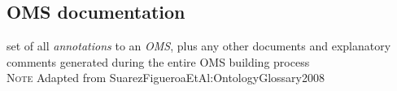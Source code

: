 \documentclass[10pt,%
\ifpretendfinal
final%
\else
draft%
\fi,
]{scrreprt}
\makeatletter
\newcommand*\CommentAuthor{}
\renewcommand*\CommentAuthor{#1}}
\newcommand*\CommentDate{}
\renewcommand*\CommentDate{#1}}
\newcommand*\CommentId{}
\renewcommand*\CommentId{#1}}
\newcommand*\CommentType{}
\renewcommand*\CommentType{#1}}
\newcommand*{\SetCommentColorByType}[1]{%
\edef\localType{{#1}}%
\expandafter\ifstrequal\localType{q-aut}{\colorlet{CommentColor}{red}}{%
\expandafter\ifstrequal\localType{q-all}{\colorlet{CommentColor}{orange}}{%
\expandafter\ifstrequal\localType{todo}{\colorlet{CommentColor}{orange}}{%
\expandafter\ifstrequal\localType{fyi}{\colorlet{CommentColor}{lightgray}}{%
\colorlet{CommentColor}{yellow}}}}}}
\newcommand*{\SetCommentPrefixByType}[1]{%
\edef\localType{{#1}}%
\expandafter\@ifmtarg\localType{%
\edef\CommentPrefix{}%
}{%
\caseupper[q]{#1}%
\edef\CommentPrefix{\thestring: }%
}}
\newcommand*{\initComment}[1]{%
\setkeys{Comment}{#1}%
\SetCommentColorByType{\CommentType}%
\relax%
\SetCommentPrefixByType{\CommentType}%
\relax%
}
\newcommand*{\todonote}[2][]{%
\initComment{#1}%
\pdfcomment[author=\CommentAuthor,color=CommentColor,date=\CommentDate,id=\CommentId]{%
\CommentPrefix
#2}}
\renewcommand*{\todonote}[2][]{%
\initComment{#1}%
\ednote{\CommentPrefix #2}}
\newcommand*{\termref}[1]{\textit{#1}}
\newcommand{\bref}[1]{[\ref{#1}]}
\newcommand{\termdefinition}[2]{\subsection*{#1}#2}
\newcommand{\nisref}[1]{#1}
\renewcommand{\bref}[1]{#1}
\newenvironment{definitions}[0]{\medskip }{}
\newenvironment{note}[0]{\ \\ \textsc{Note} \quad}{}
\makeatother
\begin{document}
\begin{definitions}
  
  
  
 

  \termdefinition{OMS documentation}{set of all \termref{annotations} to an \termref{OMS}, plus any other documents and explanatory comments generated during the entire OMS building process}
  \begin{note}
    Adapted from \bref{SuarezFigueroaEtAl:OntologyGlossary2008}
  \end{note}
\end{definitions}
\end{document}
